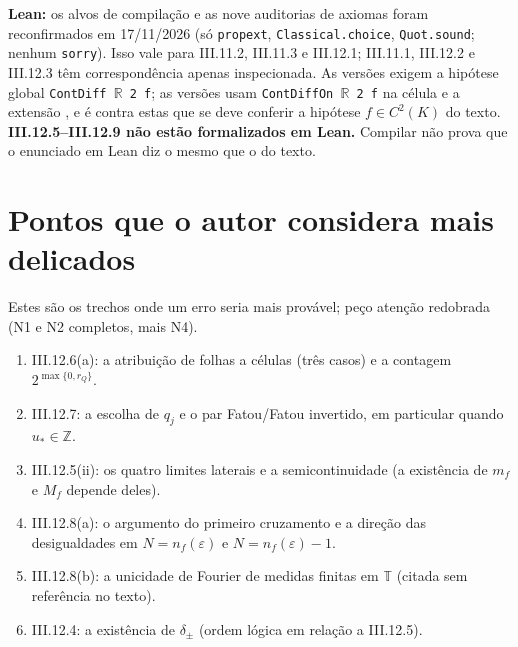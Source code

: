 \documentclass[11pt,a4paper]{article}
\begin{document}
\textbf{Lean:} os alvos de compilação e as nove auditorias de axiomas foram reconfirmados em 17/11/2026 (só \texttt{propext}, \texttt{Classical.choice}, \texttt{Quot.sound}; nenhum \texttt{sorry}). Isso vale para III.11.2, III.11.3 e III.12.1; III.11.1, III.12.2 e III.12.3 têm correspondência apenas inspecionada. As versões  exigem a hipótese global \texttt{ContDiff $\mathbb R$ 2 f}; as versões  usam \texttt{ContDiffOn $\mathbb R$ 2 f} na célula e a extensão , e é contra estas que se deve conferir a hipótese $f\in C^2(K)$ do texto. \textbf{III.12.5--III.12.9 não estão formalizados em Lean.} Compilar não prova que o enunciado em Lean diz o mesmo que o do texto.

\section{Pontos que o autor considera mais delicados}
Estes são os trechos onde um erro seria mais provável; peço atenção redobrada (N1 e N2 completos, mais N4).
\begin{enumerate}[leftmargin=1.8em]
\item III.12.6(a): a atribuição de folhas a células (três casos) e a contagem $2^{\max\{0,r_Q\}}$.
\item III.12.7: a escolha de $q_j$ e o par Fatou/Fatou invertido, em particular quando $u_*\in\mathbb Z$.
\item III.12.5(ii): os quatro limites laterais e a semicontinuidade (a existência de $m_f$ e $M_f$ depende deles).
\item III.12.8(a): o argumento do primeiro cruzamento e a direção das desigualdades em $N=n_f(\varepsilon)$ e $N=n_f(\varepsilon)-1$.
\item III.12.8(b): a unicidade de Fourier de medidas finitas em $\mathbb T$ (citada sem referência no texto).
\item III.12.4: a existência de $\delta_\pm$ (ordem lógica em relação a III.12.5).
\end{enumerate}
\end{document}
